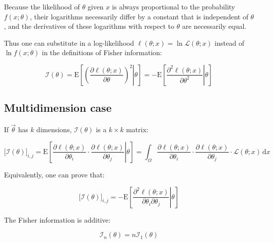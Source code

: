 Because the likelihood of $\theta$ given $x$ is always proportional to the probability $f(x ; \theta)$, their logarithms necessarily differ by a constant that is independent of $\theta$, and the derivatives of these logarithms with respect to $\theta$ are necessarily equal. 

Thus one can substitute in a log-likelihood $\ell(\theta ; x) = \ln \mathcal{L}(\theta ; x)$  instead of $\ln f(x ; \theta)$ in the definitions of Fisher information:

\begin{equation}\label{eq:fisher_info_ll}
	\mathcal{I}(\theta) 
	= \mathrm{E}\left[ \left. \left( 
	\frac{\partial \ell(\theta ; x)}
		{\partial \theta} \right)^{2} 
	\right| \theta \right] 
	= - \mathrm{E}\left[ \left. 
	\frac{\partial^{2} \ell(\theta ; x)}
		{\partial \theta^{2}} 
	\right| \theta \right] 
\end{equation}

\subsection{Multidimension case}
\label{subsec:fisher_info_k_dim}

If $\vec{\theta}$ has $k$ dimensions, $\mathcal{I}(\theta)$ is a $k \times k$ matrix:

\begin{equation}\label{eq:fisher_info_k_dim}
	\bigl[ \mathcal{I}(\theta) \bigr]_{i, j} 
	= \mathrm{E}\left[ \left. 
	\frac{\partial \ell(\theta ; x)}
		{\partial \theta_{i}} \cdot 
	\frac{\partial \ell(\theta ; x)}
		{\partial \theta_{j}} 
	\right| \theta \right] 
	= \int _{\Omega} { 
	\frac{\partial \ell(\theta ; x)}
		{\partial \theta_{i}} \cdot 
	\frac{\partial \ell(\theta ; x)}
		{\partial \theta_{j}} \cdot 
	\mathcal{L}(\theta ; x)} \, \mathrm{d}x
\end{equation}

Equivalently, one can prove that:

\begin{equation}\label{eq:fisher_info_twice_differentiable_k_dim}
	\bigl[ \mathcal{I}(\theta) \bigr]_{i, j} 
	= - \mathrm{E}\left[ \left. 
	\frac{\partial^{2} \ell(\theta ; x)}
		{\partial \theta_{i} \partial \theta_{j}} 
	\right| \theta \right]
\end{equation}

The Fisher information is additive:

\begin{equation}\label{eq:fisher_info_additive}
	\mathcal{I}_{n}(\theta) = n \mathcal{I}_{1}(\theta) 
\end{equation}
